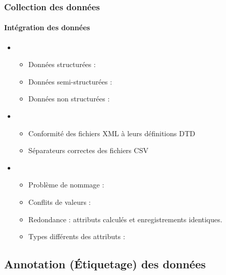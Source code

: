 \documentclass[xcolor=table]{beamer}
\begin{document}
\begin{frame}
\frametitle{Collection des données}
\framesubtitle{Intégration des données}

\begin{itemize}
	\item {}
	\begin{itemize}
		\item Données structurées : 
		\item Données semi-structurées : 
		\item Données non structurées : 
	\end{itemize}
	\item {}
	\begin{itemize}
		\item Conformité des fichiers XML à leurs définitions DTD
		\item Séparateurs correctes des fichiers CSV
	\end{itemize}
	\item {}
	\begin{itemize}
		\item Problème de nommage : 
		\item Conflits de valeurs : 
		\item Redondance : attributs calculés et enregistrements identiques.
		\item Types différents des attributs : 
	\end{itemize}
\end{itemize}

\end{frame}


\subsection{Annotation (Étiquetage) des données}
\end{document}
